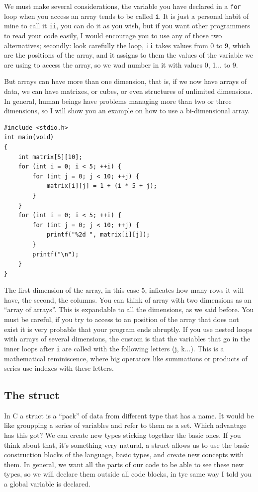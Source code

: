 \documentclass[a4paper]{article}
\begin{document}
We must make several considerations, the variable you have declared in a
\texttt{for} loop when you access an array tends to be called \texttt{i}.
It is just a personal habit of mine to call it \texttt{ii}, you can do it as
you wish, but if you want other programmers to read your code easily, I would
encourage you to use any of those two alternatives; secondly: look carefully
the loop, \texttt{ii} takes values from 0 to 9, which are the positions of
the array, and it assigns to them the values of the variable we are using
to access the array, so we wad number in it with values 0, 1... to 9.

But arrays can have more than one dimension, that is, if we now have arrays of
data, we can have matrixes, or cubes, or even structures of unlimited
dimensions. In general, human beings have problems managing more than two or
three dimensions, so I will show you an example on how to use a bi-dimensional
array.

\noindent
\begin{minipage}[H]{\linewidth}
\mbox{}
\begin{lstlisting}[style=C,
caption={Ejemplo de uso de array bidimensional},
label={lst:bidimensionalArray}]
#include <stdio.h>
int main(void)
{
    int matrix[5][10];
    for (int i = 0; i < 5; ++i) {
        for (int j = 0; j < 10; ++j) {
            matrix[i][j] = 1 + (i * 5 + j);
        }
    }
    for (int i = 0; i < 5; ++i) {
        for (int j = 0; j < 10; ++j) {
            printf("%2d ", matrix[i][j]);
        }
        printf("\n");
    }
}
\end{lstlisting}
\end{minipage}

The first dimension of the array, in this case 5, inficates how many rows
it will have, the second, the columns. You can think of array with two
dimensions as an ``array of arrays''. This is expandable to all the dimensions,
as we said before. You must be careful, if you try to access to an position of
the array that does not exist it is very probable that your program ends
abruptly. If you use nested loops with arrays of several dimensions, the
custom is that the variables that go in the inner loops after \texttt{i} are
called with the following letters (j, k...). This is a mathematical
reminiscence, where big operators like summations or products of series use
indexes with these letters.

\subsection{The struct}
In C a struct is a ``pack'' of data from different type that has a name. It
would be like groupping a series of variables and refer to them as a set.
Which advantage has this got? We can create new types sticking together the
basic ones. If you think about that, it's something very natural, a struct
allows us to use the basic construction blocks of the language, basic types,
and create new concepts with them. In general, we want all the parts of our code
to be able to see these new types, so we will declare them outside all code
blocks, in tye same way I told you a global variable is declared.
\end{document}

